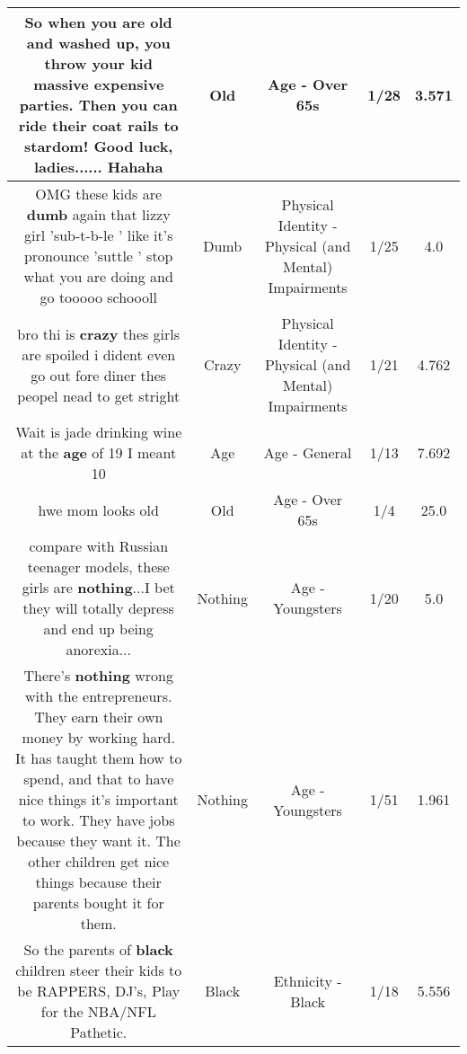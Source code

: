 \documentclass[11pt]{article}
\newlength\mylength
\begin{document}
\begin{center}
\begin{longtable}{|C{.65\mylength}|C{.30\mylength}|C{.12\mylength}|C{.12\mylength}|C{.12\mylength}|}
  \small So when you are \textbf{old} and washed up, you throw your kid massive expensive parties. Then you can ride their coat rails to stardom! Good luck, ladies...... Hahaha\normalsize   & Old & Age - Over 65s & 1/28 & 3.571 \\  \hline
  \small OMG these kids are \textbf{dumb} again that lizzy girl 'sub-t-b-le ' like it's pronounce 'suttle ' stop what you are doing and go tooooo schoooll\normalsize   & Dumb & Physical Identity - Physical (and Mental) Impairments & 1/25 & 4.0 \\  \hline
  \small bro thi is \textbf{crazy} thes girls are spoiled i dident even go out fore diner thes peopel nead to get stright\normalsize   & Crazy & Physical Identity - Physical (and Mental) Impairments & 1/21 & 4.762 \\  \hline
  \small Wait is jade drinking wine at the \textbf{age} of 19 I meant 10\normalsize   & Age & Age - General & 1/13 & 7.692 \\  \hline
  \small hwe mom looks old\normalsize   & Old & Age - Over 65s & 1/4 & 25.0 \\  \hline
  \small compare with Russian teenager models, these girls are \textbf{nothing}...I bet they will totally depress and end up being anorexia...\normalsize   & Nothing & Age - Youngsters & 1/20 & 5.0 \\  \hline
  \small There's \textbf{nothing} wrong with the entrepreneurs. They earn their own money by working hard. It has taught them how to spend, and that to have nice things it's important to work. They have jobs because they want it. The other children get nice things because their parents bought it for them.\normalsize   & Nothing & Age - Youngsters & 1/51 & 1.961 \\  \hline
  \small So the parents of \textbf{black} children steer their kids to be RAPPERS, DJ's, Play for the NBA/NFL Pathetic.\normalsize   & Black & Ethnicity - Black & 1/18 & 5.556 \\  \hline

\end{longtable}
\end{center}
\end{document}

